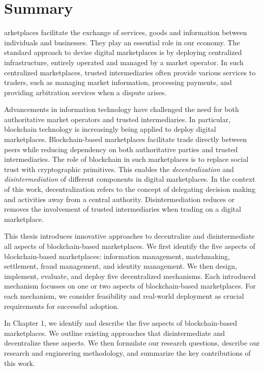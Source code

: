 \chapter*{Summary}

arketplaces facilitate the exchange of services, goods and information between individuals and businesses.
They play an essential role in our economy.
The standard approach to devise digital marketplaces is by deploying centralized infrastructure, entirely operated and managed by a market operator.
In such centralized marketplaces, trusted intermediaries often provide various services to traders, such as managing market information, processing payments, and providing arbitration services when a dispute arises.

Advancements in information technology have challenged the need for both authoritative market operators and trusted intermediaries.
In particular, blockchain technology is increasingly being applied to deploy digital marketplaces.
Blockchain-based marketplaces facilitate trade directly between peers while reducing dependency on both authoritative parties and trusted intermediaries.
The role of blockchain in such marketplaces is to replace social trust with cryptographic primitives.
This enables the \emph{decentralization} and \emph{disintermediation} of different components in digital marketplaces.
In the context of this work, decentralization refers to the concept of delegating decision making and activities away from a central authority.
Disintermediation reduces or removes the involvement of trusted intermediaries when trading on a digital marketplace.

This thesis introduces innovative approaches to decentralize and disintermediate all aspects of blockchain-based marketplaces.
We first identify the five aspects of blockchain-based marketplaces: information management, matchmaking, settlement, fraud management, and identity management.
We then design, implement, evaluate, and deploy five decentralized mechanisms.
Each introduced mechanism focusses on one or two aspects of blockchain-based marketplaces.
For each mechanism, we consider feasibility and real-world deployment as crucial requirements for successful adoption.

In Chapter 1, we identify and describe the five aspects of blockchain-based marketplaces.
We outline existing approaches that disintermediate and decentralize these aspects.
We then formulate our research questions, describe our research and engineering methodology, and summarize the key contributions of this work.

